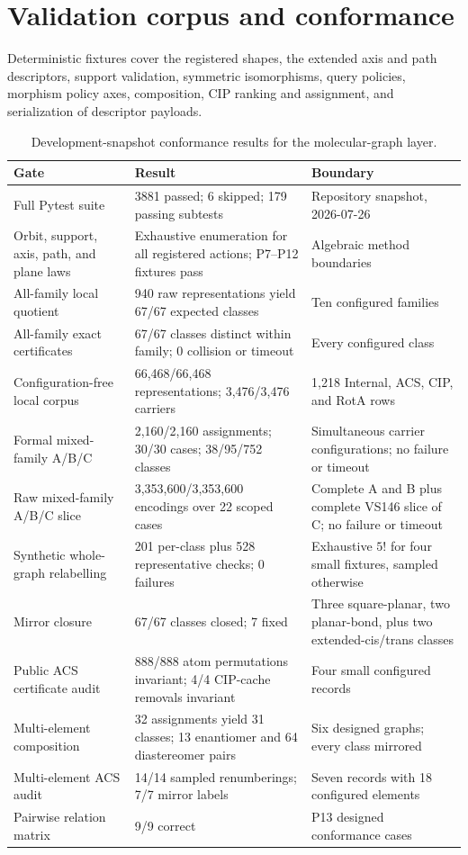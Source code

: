 \documentclass[pdflatex,sn-mathphys-num,referee,lineno]{sn-jnl}
\theoremstyle{plain}
\theoremstyle{remark}
\theoremstyle{definition}
\begin{document}
\section{Validation corpus and conformance}

Deterministic fixtures cover the registered shapes, the extended axis and path
descriptors, support validation, symmetric isomorphisms, query policies,
morphism policy axes, composition, CIP ranking and assignment, and
serialization of descriptor payloads.

\begin{table}[htbp]
\caption{Development-snapshot conformance results for the molecular-graph
layer.}
\label{tab:results}
\centering
\begin{tabularx}{\textwidth}{@{}lXX@{}}
\toprule
Gate & Result & Boundary \\
\midrule
Full Pytest suite & 3881 passed; 6 skipped; 179 passing subtests & Repository snapshot, 2026-07-26 \\
Orbit, support, axis, path, and plane laws & Exhaustive enumeration for all registered actions; P7--P12 fixtures pass & Algebraic method boundaries \\
All-family local quotient & 940 raw representations yield 67/67 expected classes & Ten configured families \\
All-family exact certificates & 67/67 classes distinct within family; 0 collision or timeout & Every configured class \\
Configuration-free local corpus & 66,468/66,468 representations; 3,476/3,476 carriers & 1,218 Internal, ACS, CIP, and RotA rows \\
Formal mixed-family A/B/C & 2,160/2,160 assignments; 30/30 cases; 38/95/752 classes & Simultaneous carrier configurations; no failure or timeout \\
Raw mixed-family A/B/C slice & 3,353,600/3,353,600 encodings over 22 scoped cases & Complete A and B plus complete VS146 slice of C; no failure or timeout \\
Synthetic whole-graph relabelling & 201 per-class plus 528 representative checks; 0 failures & Exhaustive \(5!\) for four small fixtures, sampled otherwise \\
Mirror closure & 67/67 classes closed; 7 fixed & Three square-planar, two planar-bond, plus two extended-cis/trans classes \\
Public ACS certificate audit & 888/888 atom permutations invariant; 4/4 CIP-cache removals invariant & Four small configured records \\
Multi-element composition & 32 assignments yield 31 classes; 13 enantiomer and 64 diastereomer pairs & Six designed graphs; every class mirrored \\
Multi-element ACS audit & 14/14 sampled renumberings; 7/7 mirror labels & Seven records with 18 configured elements \\
Pairwise relation matrix & 9/9 correct & P13 designed conformance cases \\
\bottomrule
\end{tabularx}
\end{table}
\end{document}
